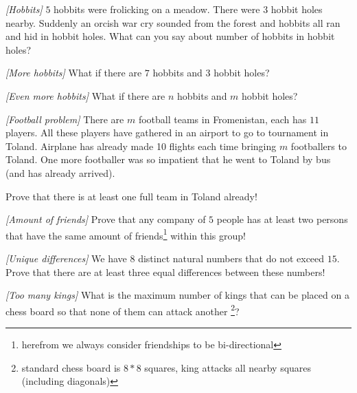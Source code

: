 




\noindent 

\begin{problem}
\textit{[Hobbits]}
$5$ hobbits were frolicking on a meadow. There were $3$ hobbit holes nearby. Suddenly an orcish war cry sounded from the forest and hobbits all ran and hid in hobbit holes. What can you say about number of hobbits in hobbit holes?
\end{problem}


\begin{problem}
\textit{[More hobbits]}
What if there are $7$ hobbits and $3$ hobbit holes?
\end{problem}

\begin{problem}
\textit{[Even more hobbits]}
What if there are $n$ hobbits and $m$ hobbit holes?
\end{problem}

\begin{problem}
\textit{[Football problem]}
There are $m$ football teams in Fromenistan, each has $11$ players. All these players have gathered in an airport to go to tournament in Toland. Airplane has already made 10 flights each time bringing $m$ footballers to Toland. One more footballer was so impatient that he went to Toland by bus (and has already arrived).  

Prove that there is at least one full team in Toland already!
\end{problem}

\begin{problem}
\textit{[Amount of friends]}
Prove that any company of $5$ people has at least two persons that have the same amount of friends\footnote{herefrom we always consider friendships to be bi-directional} within this group!
\end{problem}

\begin{problem}
\textit{[Unique differences]}
We have $8$ distinct natural numbers that do not exceed $15$. Prove that there are at least three equal differences between these numbers!
\end{problem}

\begin{problem}
\textit{[Too many kings]}
What is the maximum number of kings that can be placed on a chess board so that none of them can attack another \footnote{standard chess board is $8*8$ squares, king attacks all nearby squares (including diagonals)}?
\end{problem}


